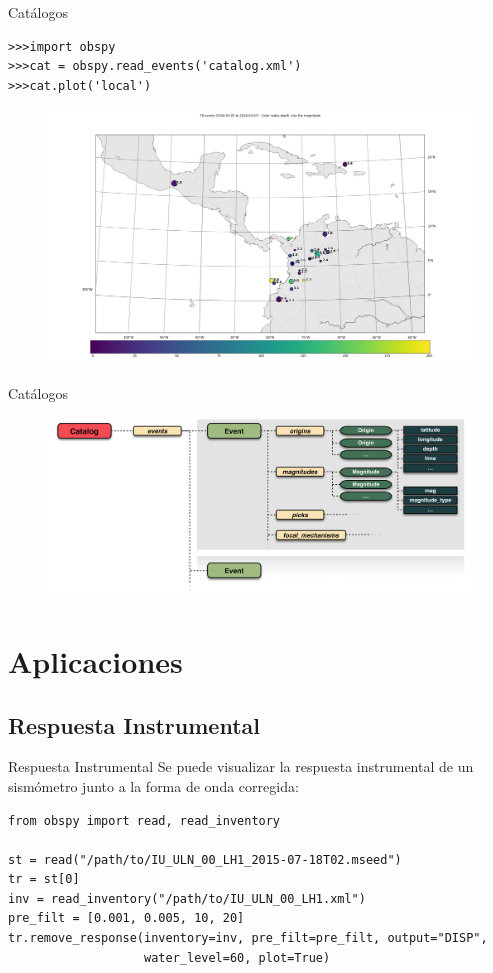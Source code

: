 \documentclass[11pt]{beamer}
\begin{document}
\begin{frame}[fragile]{Catálogos}
\begin{verbatim}
>>>import obspy
>>>cat = obspy.read_events('catalog.xml')
>>>cat.plot('local')
\end{verbatim}
\begin{figure}
\begin{center}
\includegraphics[scale=0.15]{cat.png}
\end{center}
\end{figure}
\end{frame}

\begin{frame}{Catálogos}
\begin{figure}
\includegraphics[scale=0.15]{catalog.png}
\end{figure}
\end{frame}

\section{Aplicaciones}
\subsection{Respuesta Instrumental}
\begin{frame}[fragile]{Respuesta Instrumental}
Se puede visualizar la respuesta instrumental de un sismómetro junto a la forma de onda corregida:
\begin{verbatim}
from obspy import read, read_inventory

st = read("/path/to/IU_ULN_00_LH1_2015-07-18T02.mseed")
tr = st[0]
inv = read_inventory("/path/to/IU_ULN_00_LH1.xml")
pre_filt = [0.001, 0.005, 10, 20]
tr.remove_response(inventory=inv, pre_filt=pre_filt, output="DISP",
                   water_level=60, plot=True)
\end{verbatim}
\end{frame}
\end{document}
